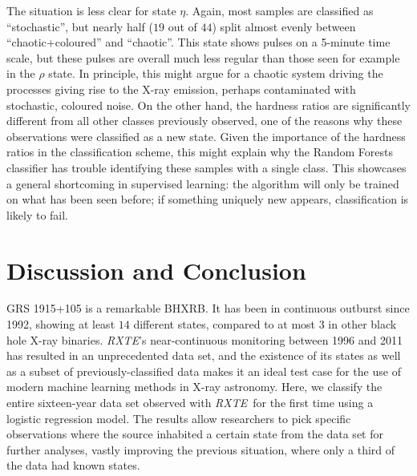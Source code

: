 \documentclass[12pt]{emulateapj}
\newcommand{\project}[1]{\textsl{#1}}
\newcommand{\rxte}{\project{RXTE}}
\begin{document}
The situation is less clear for state $\eta$. Again, most samples are classified as ``stochastic'', but nearly half ($19$ out of $44$) split almost evenly between 
``chaotic+coloured'' and ``chaotic''. This state shows pulses on a 5-minute time scale, but these pulses are overall much less regular than those 
seen for example in the $\rho$ state. In principle, this  might argue for a chaotic system driving the processes giving rise to the X-ray emission, perhaps contaminated 
with stochastic, coloured noise. On the other hand, the hardness ratios are significantly different from all other classes previously observed, one of the reasons why 
these observations were classified as a new state. Given the importance of the hardness ratios in the classification scheme, this might explain why the 
Random Forests classifier has trouble identifying these samples with a single class. This showcases a general shortcoming in supervised learning: the algorithm will only 
be trained on what has been seen before; if something uniquely new appears, classification is likely to fail.


\section{Discussion and Conclusion}
\label{sec:discussion}

GRS 1915+105 is a remarkable BHXRB. It has been in continuous outburst since 1992, showing at least $14$ different states, compared to at most 
$3$ in other black hole X-ray binaries.
\rxte's near-continuous monitoring between 1996 and 2011 has resulted in an unprecedented data set, and the existence of its states as well as a subset of previously-classified data makes it an ideal test case for the use of modern machine learning methods in X-ray astronomy.
Here, we classify the entire sixteen-year data set observed with \rxte\ for the first time using a logistic regression model. 
The results allow researchers to pick specific observations where the source inhabited a certain state from the data set for further analyses, vastly improving 
the previous situation, where only a third of the data had known states.
\end{document}
